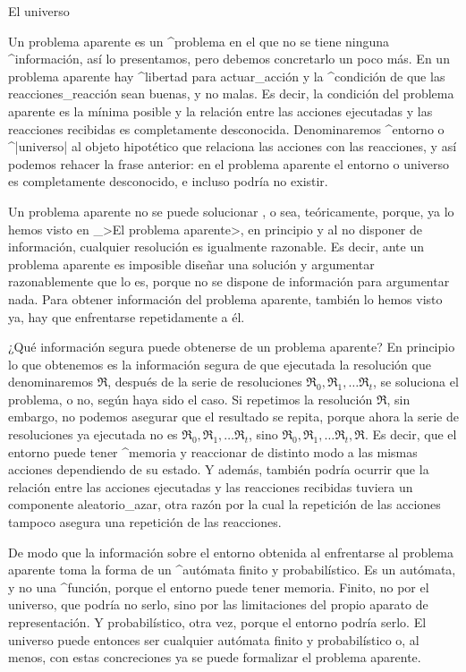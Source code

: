 \Section El universo

Un problema aparente es un ^{problema} en el que no se tiene ninguna
^{información}, así lo presentamos, pero debemos concretarlo un poco
más. En un problema aparente hay ^{libertad} para actuar_{acción} y la
^{condición} de que las reacciones_{reacción} sean buenas, y no malas.
Es decir, la condición del problema aparente es la mínima posible y la
relación entre las acciones ejecutadas y las reacciones recibidas es
completamente desconocida. Denominaremos ^{entorno} o ^|universo| al
objeto hipotético que relaciona las acciones con las reacciones, y así
podemos rehacer la frase anterior: en el problema aparente el entorno o
universo es completamente desconocido, e incluso podría no existir.

Un problema aparente no se puede solucionar , o sea,
teóricamente, porque, ya lo hemos visto en _>El problema aparente>, en
principio y al no disponer de información, cualquier resolución es
igualmente razonable. Es decir, ante un problema aparente es imposible
diseñar una solución y argumentar razonablemente que lo es, porque no se
dispone de información para argumentar nada. Para obtener información
del problema aparente, también lo hemos visto ya, hay que enfrentarse
repetidamente a él.

¿Qué información segura puede obtenerse de un problema aparente? En
principio lo que obtenemos es la información segura de que ejecutada la
resolución que denominaremos $\Re$, después de la serie de resoluciones
$\Re_0, \Re_1, \ldots \Re_t$, se soluciona el problema, o no, según haya
sido el caso. Si repetimos la resolución $\Re$, sin embargo, no podemos
asegurar que el resultado se repita, porque ahora la serie de
resoluciones ya ejecutada no es $\Re_0, \Re_1, \ldots \Re_t$, sino
$\Re_0, \Re_1, \ldots \Re_t, \Re$. Es decir, que el entorno puede tener
^{memoria} y reaccionar de distinto modo a las mismas acciones
dependiendo de su estado. Y además, también podría ocurrir que la
relación entre las acciones ejecutadas y las reacciones recibidas
tuviera un componente aleatorio_{azar}, otra razón por la cual la
repetición de las acciones tampoco asegura una repetición de las
reacciones.

De modo que la información sobre el entorno obtenida al enfrentarse al
problema aparente toma la forma de un ^{autómata} finito y
probabilístico. Es un autómata, y no una ^{función}, porque el
\hbox{entorno} puede tener memoria. Finito, no por el universo, que
podría no serlo, sino por las limitaciones del propio aparato de
representación. Y probabilístico, otra vez, porque el entorno podría
serlo. El universo puede entonces ser cualquier autómata finito y
probabilístico o, al menos, con estas concreciones ya se puede
formalizar el problema aparente.

